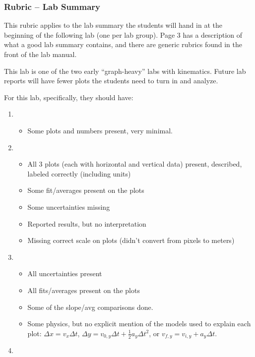 \documentclass[fleqn,letterpaper]{article}
\begin{document}
\subsubsection*{Rubric -- Lab Summary}

This rubric applies to the lab summary the students will hand in at the beginning of the following lab (one per lab group).  Page 3 has a description of what a good lab summary contains, and there are generic rubrics found in the front of the lab manual.  

This lab is one of the two early ``graph-heavy'' labs with kinematics.  Future lab reports will have fewer plots the students need to turn in and analyze.

For this lab, specifically, they should have:

\begin{enumerate}
 \item{
  \begin{itemize}
   \item{Some plots and numbers present, very minimal.}
  \end{itemize}
}
 \item{
  \begin{itemize}
   \item{All 3 plots (each with horizontal and vertical data) present, described, labeled correctly (including units)}
   \item{Some fit/averages present on the plots}
   \item{Some uncertainties missing}
   \item{Reported results, but no interpretation}
   \item{Missing correct scale on plots (didn't convert from pixels to meters)}
  \end{itemize}
}
 \item{
  \begin{itemize}
   \item{All uncertainties present}
   \item{All fits/averages present on the plots}
   \item{Some of the slope/avg comparisons done.}
   \item{Some physics, but no explicit mention of the models used to explain each plot: $\Delta x = v_x \Delta t$, $\Delta y = v_{0,y} \Delta t + \frac{1}{2}a_y \Delta t^2$, or $v_{f,y} = v_{i,y} + a_y \Delta t$.}
  \end{itemize}
}
 \item{
  \begin{itemize}

\end{itemize}}
\end{enumerate}
\end{document}
